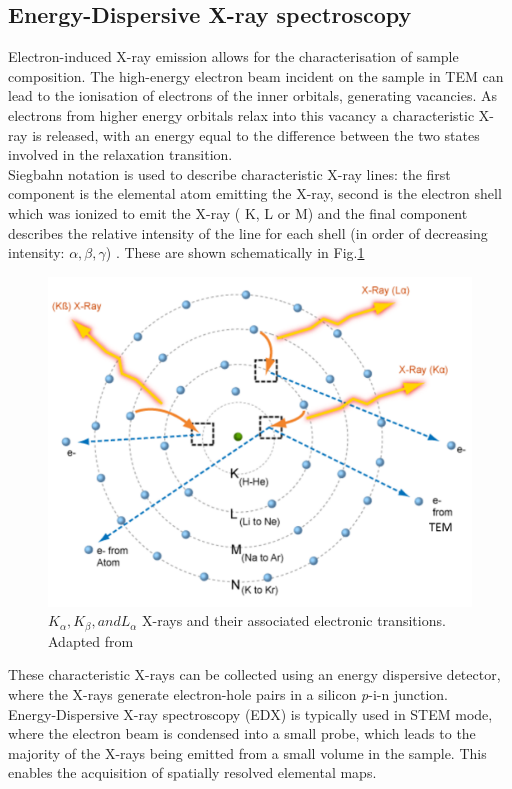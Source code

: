 \subsection{Energy-Dispersive X-ray spectroscopy}
Electron-induced X-ray emission allows for the characterisation of sample composition. The high-energy electron beam incident on the sample in TEM can lead to the ionisation of electrons of the inner orbitals, generating vacancies. As electrons from higher energy orbitals relax into this vacancy a characteristic X-ray is released, with an energy equal to the difference between the two states involved in the relaxation transition.\\
Siegbahn notation is used to describe characteristic X-ray lines: the first component is the elemental atom emitting the X-ray, second is the electron shell which was ionized to emit the X-ray ( K, L or M) and the final component describes the relative intensity of the line for each shell (in order of decreasing intensity: $\alpha, \beta, \gamma$) \cite{Facility}. These are shown schematically in Fig.\ref{xray}

\begin{figure}[!ht]
	\centering
	\includegraphics[width=1\textwidth]{Figs/Ch2/xray}
	\caption[h] {$K_{\alpha}, K_{\beta}, and L_{\alpha}$ X-rays and their associated electronic transitions. Adapted from \cite{Facility}}
	\label{xray}
\end{figure}
\FloatBarrier

These characteristic X-rays can be collected using an energy dispersive detector, where the X-rays generate electron-hole pairs in a silicon {\textit p-i-n} junction.\\
Energy-Dispersive X-ray spectroscopy (EDX) is typically used in STEM mode, where the electron beam is condensed into a small probe, which leads to the majority of the X-rays being emitted from a small volume in the sample. This enables the acquisition of spatially resolved elemental maps.

